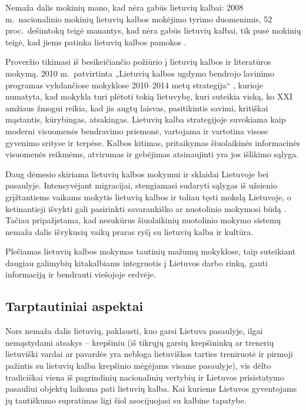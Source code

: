 \begin{multicols}{2}
    Nemaža dalis mokinių mano, kad nėra gabūs lietuvių kalbai: 2008 m.~nacionalinio mokinių lietuvių kalbos mokėjimo tyrimo duomenimis, 52 proc.~dešimtokų teigė manantys, kad nėra gabūs lietuvių kalbai, tik pusė mokinių teigė, kad jiems patinka lietuvių kalbos pamokos \cite{nec1}.   


    Proveržio tikimasi iš besikeičiančio požiūrio į lietuvių kalbos ir literatūros mokymą. 2010 m.~patvirtinta „Lietuvių kalbos ugdymo bendrojo lavinimo programas vykdančiose mokyklose 2010–2014 metų strategija“ \cite{smm5},  kurioje numatyta, kad mokykla turi plėtoti tokią lietuvybę, kuri suteikia viską, ko XXI amžiaus žmogui reikia, kad jis augtų laisvas, pasitikintis savimi, kritiškai mąstantis, kūrybingas, atsakingas. Lietuvių kalba strategijoje suvokiama kaip moderni visuomenės bendravimo priemonė, vartojama ir vartotina visose gyvenimo srityse ir terpėse. Kalbos kitimas, pritaikymas šiuolaikinės informacinės visuomenės reikmėms, atvirumas ir gebėjimas atsinaujinti yra jos išlikimo sąlyga.   

Daug dėmesio skiriama lietuvių kalbos mokymui ir sklaidai Lietuvoje bei pasaulyje. Intensyvėjant migracijai, stengiamasi sudaryti sąlygas iš užsienio grįžtantiems vaikams mokytis lietuvių kalbos ir toliau tęsti mokslą Lietuvoje, o ketinantieji išvykti gali pasirinkti savarankiško ar nuotolinio mokymosi būdą \cite{smm5}. Tačiau pripažįstama, kad nesukūrus šiuolaikinių nuotolinio mokymo sistemų nemaža dalis išvykusių vaikų praras ryšį su lietuvių kalba ir kultūra.   

Plečiamas lietuvių kalbos mokymas tautinių mažumų mokyklose, taip suteikiant daugiau galimybių kitakalbiams integruotis į Lietuvos darbo rinką, gauti informaciją ir bendrauti viešojoje erdvėje.

\subsection{Tarptautiniai aspektai}

 Nors nemaža dalis lietuvių, paklausti, kuo garsi Lietuva pasaulyje, ilgai nemąstydami atsakys – krepšiniu (iš tikrųjų garsių krepšininkų ar trenerių lietuviški vardai ar pavardės yra nebloga lietuviškos tarties treniruotė ir pirmoji pažintis su lietuvių kalba krepšinio mėgėjams visame pasaulyje), vis dėlto tradiciškai viena iš pagrindinių nacionalinių vertybių ir Lietuvos prisistatymo pasauliui objektų laikoma pati lietuvių kalba. Kai kuriems Lietuvos gyventojams jų tautiškumo supratimas ligi šiol asocijuojasi su kalbine tapatybe.


\end{multicols}
